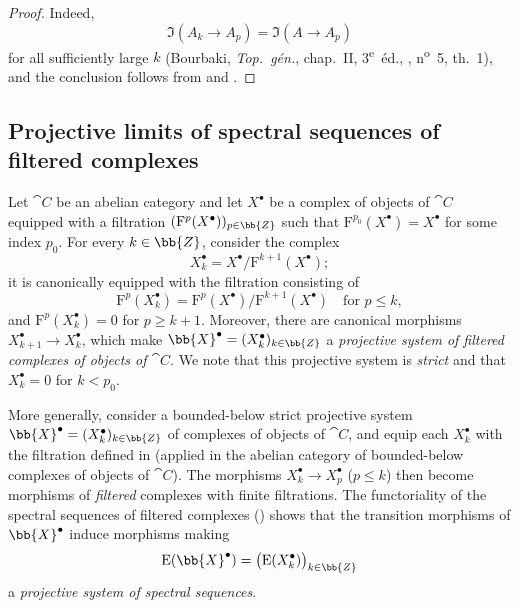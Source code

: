 \begin{proof}
Indeed,
\[
  \Im(A_k\longrightarrow A_p)
  =
  \Im(A\longrightarrow A_p)
\]
for all sufficiently large $k$
(Bourbaki, \emph{Top.\ g\'{e}n.}, chap.~II,
3\textsuperscript{e}~\'{e}d., ,
n\textsuperscript{o}~5, th.~1), and the conclusion follows from
 and .
\end{proof}

\subsection{Projective limits of spectral sequences of filtered complexes}
\label{subsection:0.13.5}

\begin{env}[13.5.1]
\label{0.13.5.1}
Let $\cat{C}$ be an abelian category and let $X^\bullet$ be a complex
of objects of $\cat{C}$ equipped with a filtration
$(\mathrm{F}^p(X^\bullet))_{p\in\bb{Z}}$ such that
$\mathrm{F}^{p_0}(X^\bullet)=X^\bullet$ for some index $p_0$.
For every $k\in\bb{Z}$, consider the complex
\[
  X^\bullet_k=X^\bullet/\mathrm{F}^{k+1}(X^\bullet);
\]
it is canonically equipped with the filtration consisting of
\[
  \mathrm{F}^p(X^\bullet_k)
  =
  \mathrm{F}^p(X^\bullet)/\mathrm{F}^{k+1}(X^\bullet)
  \quad\text{for }p\leq k,
\]
and $\mathrm{F}^p(X^\bullet_k)=0$ for $p\geq k+1$.
Moreover, there are canonical morphisms
$X^\bullet_{k+1}\longrightarrow X^\bullet_k$, which make
$\bb{X}^\bullet=(X^\bullet_k)_{k\in\bb{Z}}$ a \emph{projective system
of filtered complexes of objects of $\cat{C}$}.
We note that this projective system is \emph{strict} and that
$X^\bullet_k=0$ for $k<p_0$.
\end{env}

\begin{env}[13.5.2]
\label{0.13.5.2}
More generally, consider a bounded-below strict projective system
$\bb{X}^\bullet=(X^\bullet_k)_{k\in\bb{Z}}$ of complexes of objects of
$\cat{C}$, and equip each $X^\bullet_k$ with the filtration defined in
 (applied in the abelian category of bounded-below
complexes of objects of $\cat{C}$).
The morphisms
$X^\bullet_k\longrightarrow X^\bullet_p$ ($p\leq k$) then become
morphisms of \emph{filtered} complexes with finite filtrations.
The functoriality of the spectral sequences of filtered complexes
() shows that the transition morphisms of
$\bb{X}^\bullet$ induce morphisms making
\[
  \mathrm{E}(\bb{X}^\bullet)
  =
  \bigl(\mathrm{E}(X^\bullet_k)\bigr)_{k\in\bb{Z}}
\]
a \emph{projective system of spectral sequences}.
\end{env}

